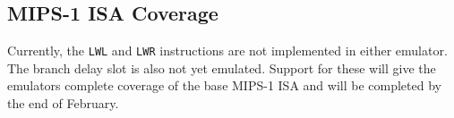 \subsection{MIPS-1 ISA Coverage}

Currently, the \texttt{LWL} and \texttt{LWR} instructions are not implemented in either emulator. The branch delay slot is also not yet emulated. Support for these will give the emulators complete coverage of the base MIPS-1 ISA and will be completed by the end of February.